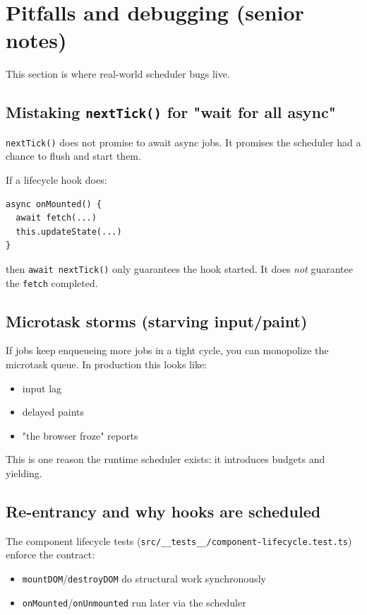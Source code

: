 \section{Pitfalls and debugging (senior notes)}

This section is where real-world scheduler bugs live.

\subsection{Mistaking \texttt{nextTick()} for "wait for all async"}

      \texttt{nextTick()} does not promise to await async jobs.
It promises the scheduler had a chance to flush and start them.

If a lifecycle hook does:

\begin{verbatim}
async onMounted() {
  await fetch(...)
  this.updateState(...)
}
\end{verbatim}

then \texttt{await nextTick()} only guarantees the hook started.
It does \emph{not} guarantee the \texttt{fetch} completed.

\subsection{Microtask storms (starving input/paint)}

If jobs keep enqueueing more jobs in a tight cycle, you can monopolize the microtask queue.
In production this looks like:

\begin{itemize}
  \item input lag
  \item delayed paints
  \item "the browser froze" reports
\end{itemize}

This is one reason the runtime scheduler exists: it introduces budgets and yielding.

\subsection{Re-entrancy and why hooks are scheduled}

The component lifecycle tests (\texttt{src/\_\_tests\_\_/component-lifecycle.test.ts}) enforce the contract:

\begin{itemize}
  \item \texttt{mountDOM}/\texttt{destroyDOM} do structural work synchronously
  \item \texttt{onMounted}/\texttt{onUnmounted} run later via the scheduler
\end{itemize}

